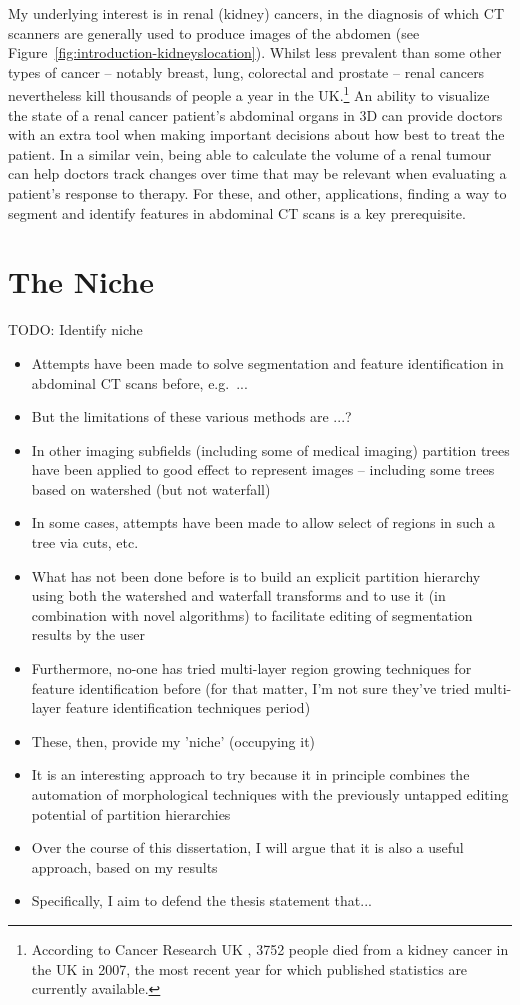 My underlying interest is in renal (kidney) cancers, in the diagnosis of which CT scanners are generally used to produce images of the abdomen (see Figure~\ref{fig:introduction-kidneyslocation}). Whilst less prevalent than some other types of cancer -- notably breast, lung, colorectal and prostate -- renal cancers nevertheless kill thousands of people a year in the UK.\footnote{According to Cancer Research UK \cite{cruk-kidneycancermortality}, 3752 people died from a kidney cancer in the UK in 2007, the most recent year for which published statistics are currently available.} An ability to visualize the state of a renal cancer patient's abdominal organs in 3D can provide doctors with an extra tool when making important decisions about how best to treat the patient. In a similar vein, being able to calculate the volume of a renal tumour can help doctors track changes over time that may be relevant when evaluating a patient's response to therapy. For these, and other, applications, finding a way to segment and identify features in abdominal CT scans is a key prerequisite.

\section{The Niche}

TODO: Identify niche

\begin{itemize}

\item Attempts have been made to solve segmentation and feature identification in abdominal CT scans before, e.g.~...
\item But the limitations of these various methods are ...?
\item In other imaging subfields (including some of medical imaging) partition trees have been applied to good effect to represent images -- including some trees based on watershed (but not waterfall)
\item In some cases, attempts have been made to allow select of regions in such a tree via cuts, etc.
\item What has not been done before is to build an explicit partition hierarchy using both the watershed and waterfall transforms and to use it (in combination with novel algorithms) to facilitate editing of segmentation results by the user
\item Furthermore, no-one has tried multi-layer region growing techniques for feature identification before (for that matter, I'm not sure they've tried multi-layer feature identification techniques period)
\item These, then, provide my 'niche' (occupying it)
\item It is an interesting approach to try because it in principle combines the automation of morphological techniques with the previously untapped editing potential of partition hierarchies
\item Over the course of this dissertation, I will argue that it is also a useful approach, based on my results
\item Specifically, I aim to defend the thesis statement that...

\end{itemize}

